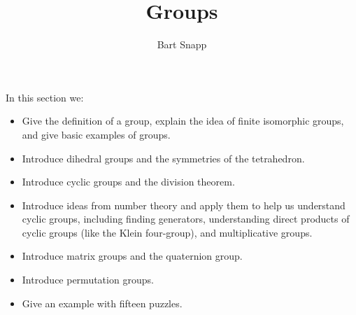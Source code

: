 \documentclass{ximera}
\author{Bart Snapp}
\title{Groups}
\begin{document}
\begin{abstract}
\end{abstract}
\maketitle
In this section we:

\begin{itemize}
\item Give the definition of a group, explain the idea of finite
  isomorphic groups, and give basic examples of groups.
\item Introduce dihedral groups and the symmetries of the tetrahedron.
\item Introduce cyclic groups and the division theorem.
\item Introduce ideas from number theory and apply them to help us
  understand cyclic groups, including finding generators,
  understanding direct products of cyclic groups (like the Klein
  four-group), and multiplicative groups.
\item Introduce matrix groups and the quaternion group.
\item Introduce permutation groups.
\item Give an example with fifteen puzzles.
\end{itemize}
\end{document}
